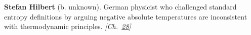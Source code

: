 \textbf{Stefan Hilbert} (b. unknown). German physicist who challenged standard entropy definitions by arguing negative absolute temperatures are inconsistent with thermodynamic principles. \emph{[Ch.~\hyperref[ch:negativetemperature]{28}]}

